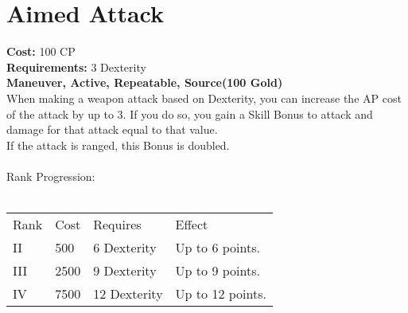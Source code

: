 \section{Aimed Attack}\label{maneuver:aimedAttack}
\textbf{Cost:} 100 CP\\
\textbf{Requirements:} 3 Dexterity\\
\textbf{Maneuver, Active, Repeatable, Source(100 Gold)}\\
When making a weapon attack based on Dexterity, you can increase the AP cost of the attack by up to 3.
If you do so, you gain a Skill Bonus to attack and damage for that attack equal to that value.\\
If the attack is ranged, this Bonus is doubled.\\
\\
Rank Progression:\\
\\
\begin{tabular}{l | l | l | l}
	Rank & Cost & Requires & Effect\\
	II & 500 & 6 Dexterity & Up to 6 points.\\
	III & 2500 & 9 Dexterity & Up to 9 points.\\
	IV & 7500 & 12 Dexterity & Up to 12 points.\\
\end{tabular}